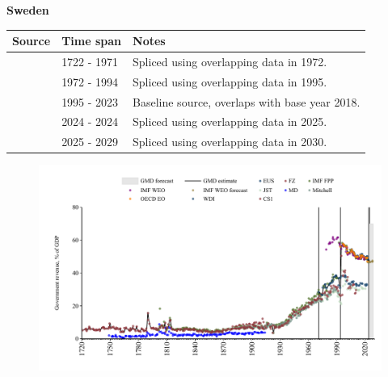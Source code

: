\documentclass[12pt,a4paper,landscape]{article}
\begin{document}
\begin{adjustbox}{max totalsize={\paperwidth}{\paperheight},center}
\begin{minipage}[t][\textheight][t]{\textwidth}
\vspace*{0.5cm}
{}
\begin{center}
{\Large\bfseries Sweden}
\end{center}
\vspace{0.5cm}
\begin{table}[H]
\centering
\small
\begin{tabular}{|l|l|l|}
\hline
\textbf{Source} & \textbf{Time span} & \textbf{Notes} \\
\hline
\rowcolor{white}\cite{CS1_SWE}& 1722 - 1971 &Spliced using overlapping data in 1972.\\
\rowcolor{lightgray}\cite{WDI}& 1972 - 1994 &Spliced using overlapping data in 1995.\\
\rowcolor{white}\cite{OECD_EO}& 1995 - 2023 &Baseline source, overlaps with base year 2018.\\
\rowcolor{lightgray}\cite{EUS}& 2024 - 2024 &Spliced using overlapping data in 2025.\\
\rowcolor{white}\cite{IMF_WEO_forecast}& 2025 - 2029 &Spliced using overlapping data in 2030.\\
\hline
\end{tabular}
\end{table}
\begin{figure}[H]
\centering
\includegraphics[width=\textwidth,height=0.6\textheight,keepaspectratio]{graphs/SWE_govrev_GDP.pdf}
\end{figure}
\end{minipage}
\end{adjustbox}
\end{document}
